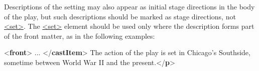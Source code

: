  Descriptions of the setting may also appear as initial stage directions in the body of the play, but such descriptions should be marked as stage directions, not \hyperref[TEI.set]{<set>}. The \hyperref[TEI.set]{<set>} element should be used only where the description forms part of the front matter, as in the following examples: \par\bgroup{}\exampleFont \begin{shaded}\noindent\mbox{}{<\textbf{front}>}\mbox{}\newline 
{}\mbox{}\newline 
\hspace*{1em} ... {</\textbf{castItem}>}\mbox{}\newline 
{}\mbox{}\newline 
{}\mbox{}\newline 
\hspace*{1em}The action of the play is set in Chicago's\mbox{}\newline 
\hspace*{1em}\hspace*{1em}\hspace*{1em}\hspace*{1em} Southside, sometime between World War II and the\mbox{}\newline 
\hspace*{1em}\hspace*{1em}\hspace*{1em}\hspace*{1em} present.{</\textbf{p}>}\mbox{}\newline 
{}\mbox{}\newline 

\end{shaded}
